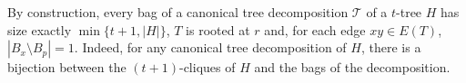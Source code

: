 \documentclass[kpfonts]{patmorin}
\theoremstyle{named}
\begin{document}
By construction, every bag of a canonical tree decomposition $\mathcal{T}$ of a $t$-tree $H$ has size exactly $\min\{t+1,|H|\}$, $T$ is rooted at $r$ and, for each edge $xy\in E(T)$, $|B_x\setminus B_p|=1$.  Indeed, for any canonical tree decomposition of $H$, there is a bijection between the $(t+1)$-cliques of $H$ and the bags of the decomposition.
\end{document}
